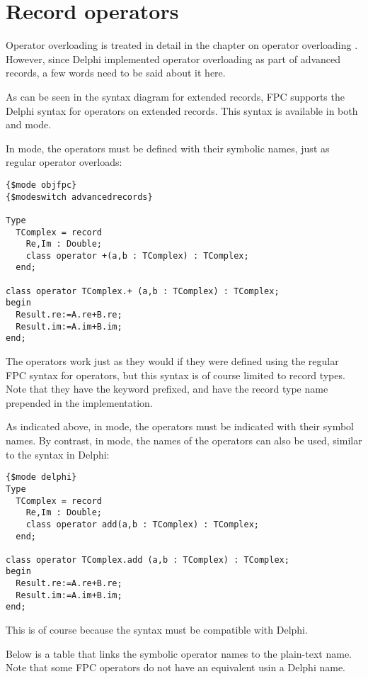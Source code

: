 \section{Record operators}
Operator overloading is treated in detail in the chapter on operator overloading .
However, since Delphi implemented operator overloading as part of advanced
records, a few words need to be said about it here. 

As can be seen in the syntax diagram for extended records, FPC supports the Delphi syntax for operators on extended
records. This syntax is available in both  and  mode.

In  mode, the operators must be defined with their symbolic
names, just as regular operator overloads:
\begin{verbatim}
{$mode objfpc}
{$modeswitch advancedrecords}

Type
  TComplex = record
    Re,Im : Double;
    class operator +(a,b : TComplex) : TComplex;
  end;

class operator TComplex.+ (a,b : TComplex) : TComplex;
begin
  Result.re:=A.re+B.re;
  Result.im:=A.im+B.im;
end;
\end{verbatim}
The operators work just as they would if they were defined using the regular FPC syntax for
operators, but this syntax is of course limited to record types.
Note that they have the  keyword prefixed, and have the record type
name prepended in the implementation.


As indicated above, in  mode, the operators must be indicated with their symbol names. 
By contrast, in  mode, the names of the operators can also be used, similar to the syntax in Delphi:
\begin{verbatim}
{$mode delphi}
Type
  TComplex = record
    Re,Im : Double;
    class operator add(a,b : TComplex) : TComplex;
  end;

class operator TComplex.add (a,b : TComplex) : TComplex;
begin
  Result.re:=A.re+B.re;
  Result.im:=A.im+B.im;
end;
\end{verbatim}
This is of course because the syntax must be compatible with Delphi.

Below is a table that links the symbolic operator names to the plain-text
name. Note that some FPC operators do not have an equivalent usin a Delphi
name.

